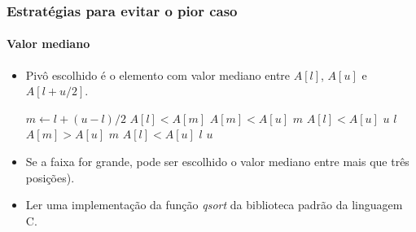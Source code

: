 \documentclass{beamer}
\begin{document}
\begin{frame}

  \frametitle{Estratégias para evitar o pior caso}
  \framesubtitle{Valor mediano}

  \begin{itemize}

    \item Pivô escolhido é o elemento com valor mediano entre
      $A[l]$, $A[u]$ e $A[l+u/2]$.


\begin{codebox}
\li $m \gets l + (u-l)/2$
\li \If $A[l] < A[m]$
\li \Then \If $A[m] < A[u]$ \> \> \> \Then \Return $m$
\li       \Else \If $A[l] < A[u]$ \> \> \> \Then \Return $u$
\li         \Else \Return $l$
            \End
          \End
\li \Else \If $A[m] > A[u]$ \> \> \> \Then \Return $m$
\li    \Else \If $A[l] < A[u]$ \> \> \> \Then \Return $l$
\li      \Else \Return $u$
         \End
       \End
    \End
\end{codebox}

\item Se a faixa for grande, pode ser escolhido o valor mediano
  entre mais que três posições).

\item Ler uma implementação da função \textit{qsort} da biblioteca padrão da
  linguagem C.
  \end{itemize}

\end{frame}
\end{document}
